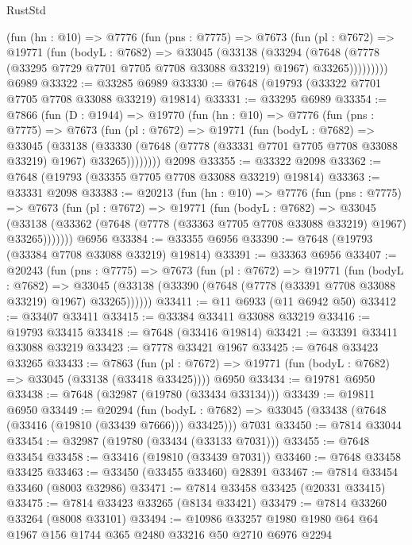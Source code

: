 \begin{lexlean}{RustStd}
\begin{coremodule}
        (fun (hn : @10) =>
        @7776
          (fun (pns : @7775) =>
          @7673
            (fun (pl : @7672) =>
            @19771
              (fun (bodyL : @7682) =>
              @33045
                (@33138
                  (@33294
                    (@7648
                      (@7778 (@33295 @7729 @7701 @7705 @7708 @33088 @33219) @1967)
                      @33265)))))))))
    @6989
@33322 := @33285 @6989
@33330 := @7648 (@19793 (@33322 @7701 @7705 @7708 @33088 @33219) @19814)
@33331 := @33295 @6989
@33354 := @7866
    (fun (D : @1944) =>
    @19770
      (fun (hn : @10) =>
      @7776
        (fun (pns : @7775) =>
        @7673
          (fun (pl : @7672) =>
          @19771
            (fun (bodyL : @7682) =>
            @33045
              (@33138
                (@33330 (@7648 (@7778 (@33331 @7701 @7705 @7708 @33088 @33219) @1967) @33265))))))))
    @2098
@33355 := @33322 @2098
@33362 := @7648 (@19793 (@33355 @7705 @7708 @33088 @33219) @19814)
@33363 := @33331 @2098
@33383 := @20213
    (fun (hn : @10) =>
    @7776
      (fun (pns : @7775) =>
      @7673
        (fun (pl : @7672) =>
        @19771
          (fun (bodyL : @7682) =>
          @33045
            (@33138 (@33362 (@7648 (@7778 (@33363 @7705 @7708 @33088 @33219) @1967) @33265)))))))
    @6956
@33384 := @33355 @6956
@33390 := @7648 (@19793 (@33384 @7708 @33088 @33219) @19814)
@33391 := @33363 @6956
@33407 := @20243
    (fun (pns : @7775) =>
    @7673
      (fun (pl : @7672) =>
      @19771
        (fun (bodyL : @7682) =>
        @33045 (@33138 (@33390 (@7648 (@7778 (@33391 @7708 @33088 @33219) @1967) @33265))))))
@33411 := @11 @6933 (@11 @6942 @50)
@33412 := @33407 @33411
@33415 := @33384 @33411 @33088 @33219
@33416 := @19793 @33415
@33418 := @7648 (@33416 @19814)
@33421 := @33391 @33411 @33088 @33219
@33423 := @7778 @33421 @1967
@33425 := @7648 @33423 @33265
@33433 := @7863
    (fun (pl : @7672) => @19771 (fun (bodyL : @7682) => @33045 (@33138 (@33418 @33425))))
    @6950
@33434 := @19781 @6950
@33438 := @7648 (@32987 (@19780 (@33434 @33134)))
@33439 := @19811 @6950
@33449 := @20294
    (fun (bodyL : @7682) => @33045 (@33438 (@7648 (@33416 (@19810 (@33439 @7666))) @33425)))
    @7031
@33450 := @7814 @33044
@33454 := @32987 (@19780 (@33434 (@33133 @7031)))
@33455 := @7648 @33454
@33458 := @33416 (@19810 (@33439 @7031))
@33460 := @7648 @33458 @33425
@33463 := @33450 (@33455 @33460) @28391
@33467 := @7814 @33454 @33460 (@8003 @32986)
@33471 := @7814 @33458 @33425 (@20331 @33415)
@33475 := @7814 @33423 @33265 (@8134 @33421)
@33479 := @7814 @33260 @33264 (@8008 @33101)
@33494 := @10986 @33257 @1980 @1980 @64 @64 @1967 @156 @1744 @365 @2480 @33216 @50 @2710 @6976 @2294

\end{coremodule}
\end{lexlean}
